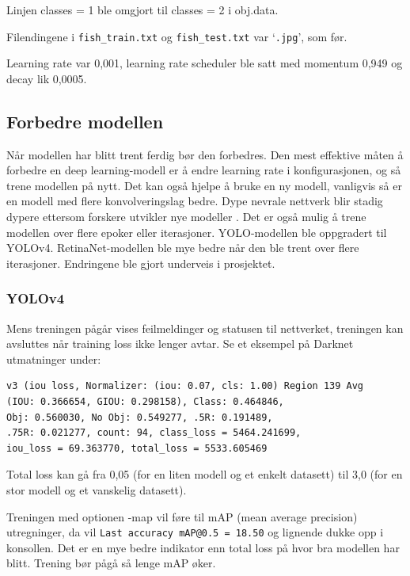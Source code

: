 Linjen classes = 1 ble omgjort til classes = 2 i obj.data. 

Filendingene i \texttt{fish\_train.txt} og \texttt{fish\_test.txt} var `\texttt{.jpg}', som før.

Learning rate var 0,001, learning rate scheduler ble satt med momentum 0,949 og decay lik 0,0005.

\subsection{Forbedre modellen}

Når modellen har blitt trent ferdig bør den forbedres. Den mest effektive måten å forbedre en deep learning-modell er å endre learning rate i konfigurasjonen, og så trene modellen på nytt. Det kan også hjelpe å bruke en ny modell, vanligvis så er en modell med flere konvolveringslag bedre. Dype nevrale nettverk blir stadig dypere ettersom forskere utvikler nye modeller \cite{Szegedy m.fl. s. 1}. Det er også mulig å trene modellen over flere epoker eller iterasjoner. YOLO-modellen ble oppgradert til YOLOv4. RetinaNet-modellen ble mye bedre når den ble trent over flere iterasjoner. Endringene ble gjort underveis i prosjektet. 

\subsubsection{YOLOv4}

Mens treningen pågår vises feilmeldinger og statusen til nettverket, treningen kan avsluttes når training loss ikke lenger avtar. Se et eksempel på Darknet utmatninger under:

\begin{verbatim}
v3 (iou loss, Normalizer: (iou: 0.07, cls: 1.00) Region 139 Avg
(IOU: 0.366654, GIOU: 0.298158), Class: 0.464846,
Obj: 0.560030, No Obj: 0.549277, .5R: 0.191489,
.75R: 0.021277, count: 94, class_loss = 5464.241699,
iou_loss = 69.363770, total_loss = 5533.605469 
\end{verbatim}

Total loss kan gå fra 0,05 (for en liten modell og et enkelt datasett) til 3,0 (for en stor modell og et vanskelig datasett). \cite{Bochkovskiy 2020}

Treningen med optionen -map vil føre til mAP (mean average precision) utregninger, da vil \texttt{Last accuracy mAP@0.5 = 18.50} og lignende dukke opp i konsollen. Det er en mye bedre indikator enn total loss på hvor bra modellen har blitt. Trening bør pågå så lenge mAP øker. \cite{Bochkovskiy 2020}%

